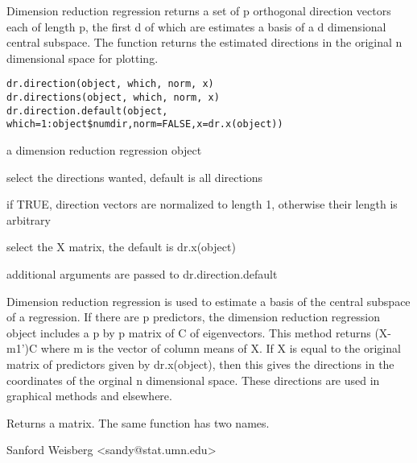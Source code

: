 \begin{Description}\relax
Dimension reduction regression returns a set of p orthogonal direction
vectors each of length p, the first d of which are estimates a basis of a 
d dimensional central subspace.  The function returns the estimated directions 
in the original n dimensional space for plotting.
\end{Description}
\begin{Usage}
\begin{verbatim}
dr.direction(object, which, norm, x)
dr.directions(object, which, norm, x)
dr.direction.default(object, which=1:object$numdir,norm=FALSE,x=dr.x(object))
\end{verbatim}
\end{Usage}
\begin{Arguments}
\begin{ldescription}
\item[\code{object}] a dimension reduction regression object 
\item[\code{which}] select the directions wanted, default is all directions 
\item[\code{norm}] if TRUE, direction vectors are normalized to length 1, otherwise
their length is arbitrary
\item[\code{x}] select the X matrix, the default is dr.x(object)
\item[\code{...}] additional arguments are passed to dr.direction.default
\end{ldescription}
\end{Arguments}
\begin{Details}\relax
Dimension reduction regression is used to estimate a basis of the central
subspace of a regression.  If there are p predictors, the dimension
reduction regression object includes a p by p matrix of C of eigenvectors.
This method returns (X-m1')C where m is the vector of column means of X.  If
X is equal to the original matrix of predictors given by dr.x(object), then
this gives the directions in the coordinates of the orginal n dimensional
space.  These directions are used in graphical methods and elsewhere.
\end{Details}
\begin{Value}
Returns a matrix.  The same function has two names.
\end{Value}
\begin{Author}\relax
Sanford Weisberg <sandy@stat.umn.edu>
\end{Author}
